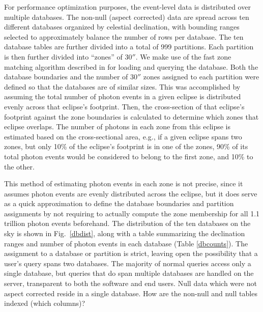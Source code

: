 \documentclass[5p]{elsarticle}
\begin{document}
For performance optimization purposes, the event-level data is distributed over multiple databases. The non-null (aspect corrected) data are spread across ten different databases organized by celestial declination, with bounding ranges selected to approximately balance the number of rows per database.  The ten database tables are further divided into a total of 999 partitions. Each partition is then further divided into ``zones'' of $30''$. We make use of the fast zone matching algorithm described in \citet{gra2006} for loading and querying the database.  Both the database boundaries and the number of $30''$ zones assigned to each partition were defined so that the databases are of similar sizes.  This was accomplished by assuming the total number of photon events in a given eclipse is distributed evenly across that eclipse's footprint.  Then, the cross-section of that eclipse's footprint against the zone boundaries is calculated to determine which zones that eclipse overlaps.  The number of photons in each zone from this eclipse is estimated based on the cross-sectional area, e.g., if a given eclipse spans two zones, but only 10\% of the eclipse's footprint is in one of the zones, 90\% of its total photon events would be considered to belong to the first zone, and 10\% to the other.

This method of estimating photon events in each zone is not precise, since it assumes photon events are evenly distributed across the eclipse, but it does serve as a quick approximation to define the database boundaries and partition assignments by not requiring to actually compute the zone membership for all 1.1 trillion photon events beforehand.  The distribution of the ten databases on the sky is shown in Fig.\ \ref{dbdist}, along with a table summarizing the declination ranges and number of photon events in each database (Table \ref{dbcounts}). The assignment to a database or partition is strict, leaving open the possibility that a user's query spans two databases. The majority of normal queries access only a single database, but queries that do span multiple databases are handled on the server, transparent to both the software and end users. Null data which were not aspect corrected reside in a single database.  {\color{red}How are the non-null and null tables indexed (which columns)?}
\end{document}
